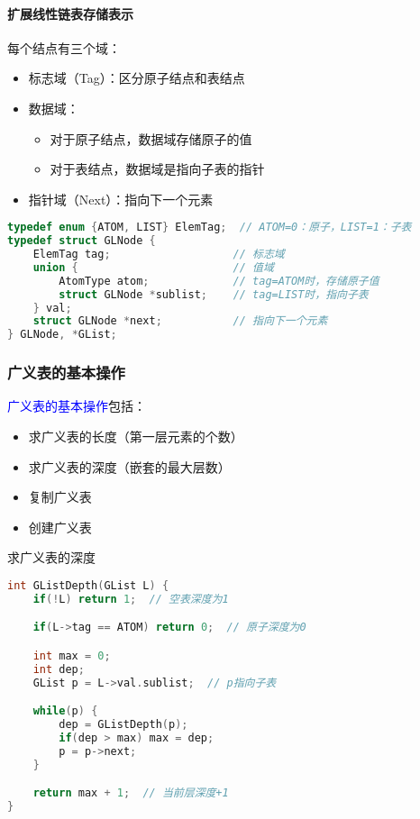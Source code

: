 \documentclass{../../note}
\begin{document}
\paragraph{扩展线性链表存储表示}

每个结点有三个域：
\begin{itemize}
  \item 标志域（Tag）：区分原子结点和表结点
  \item 数据域：
    \begin{itemize}
      \item 对于原子结点，数据域存储原子的值
      \item 对于表结点，数据域是指向子表的指针
    \end{itemize}
  \item 指针域（Next）：指向下一个元素
\end{itemize}

\begin{lstlisting}[language=C]
typedef enum {ATOM, LIST} ElemTag;  // ATOM=0：原子，LIST=1：子表
typedef struct GLNode {
    ElemTag tag;                   // 标志域
    union {                        // 值域
        AtomType atom;             // tag=ATOM时，存储原子值
        struct GLNode *sublist;    // tag=LIST时，指向子表
    } val;
    struct GLNode *next;           // 指向下一个元素
} GLNode, *GList;
\end{lstlisting}

\subsubsection{广义表的基本操作}

\textcolor{blue}{广义表的基本操作}包括：
\begin{itemize}
  \item 求广义表的长度（第一层元素的个数）
  \item 求广义表的深度（嵌套的最大层数）
  \item 复制广义表
  \item 创建广义表
\end{itemize}

求广义表的深度

\begin{lstlisting}[language=C]
int GListDepth(GList L) {
    if(!L) return 1;  // 空表深度为1

    if(L->tag == ATOM) return 0;  // 原子深度为0

    int max = 0;
    int dep;
    GList p = L->val.sublist;  // p指向子表

    while(p) {
        dep = GListDepth(p);
        if(dep > max) max = dep;
        p = p->next;
    }

    return max + 1;  // 当前层深度+1
}
\end{lstlisting}
\end{document}
